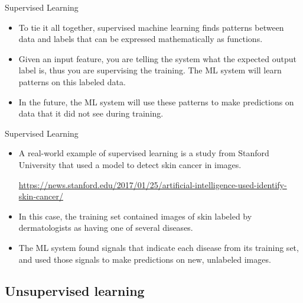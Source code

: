 \documentclass{beamer}
\begin{document}

\begin{frame}{Supervised Learning}

\begin{itemize}
\item To tie it all together, supervised machine learning finds patterns between data and labels that can be expressed mathematically as functions. 

\item Given an input feature, you are telling the system what the expected output label is, thus you are supervising the training. The ML system will learn patterns on this labeled data. 

\item In the future, the ML system will use these patterns to make predictions on data that it did not see during training.

\end{itemize}

\end{frame}


\begin{frame}{Supervised Learning}

\begin{itemize}

\item A real-world example of supervised learning is a study from Stanford University that used a model to detect skin cancer in images. 

\medskip
\url{https://news.stanford.edu/2017/01/25/artificial-intelligence-used-identify-skin-cancer/}

\item In this case, the training set contained images of skin labeled by dermatologists as having one of several diseases. 

\item The ML system found signals that indicate each disease from its training set, and used those signals to make predictions on new, unlabeled images.

\end{itemize}

\end{frame}


\subsection{Unsupervised learning}
\end{document}
